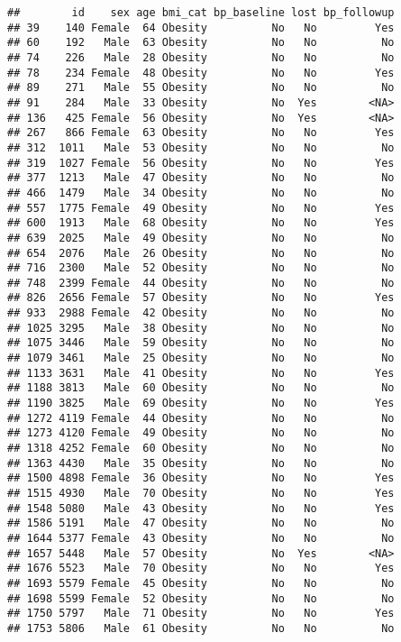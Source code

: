 \documentclass[
]{article}
\begin{document}
\begin{verbatim}
##        id    sex age bmi_cat bp_baseline lost bp_followup
## 39    140 Female  64 Obesity          No   No         Yes
## 60    192   Male  63 Obesity          No   No          No
## 74    226   Male  28 Obesity          No   No          No
## 78    234 Female  48 Obesity          No   No         Yes
## 89    271   Male  55 Obesity          No   No          No
## 91    284   Male  33 Obesity          No  Yes        <NA>
## 136   425 Female  56 Obesity          No  Yes        <NA>
## 267   866 Female  63 Obesity          No   No         Yes
## 312  1011   Male  53 Obesity          No   No          No
## 319  1027 Female  56 Obesity          No   No         Yes
## 377  1213   Male  47 Obesity          No   No          No
## 466  1479   Male  34 Obesity          No   No          No
## 557  1775 Female  49 Obesity          No   No         Yes
## 600  1913   Male  68 Obesity          No   No         Yes
## 639  2025   Male  49 Obesity          No   No          No
## 654  2076   Male  26 Obesity          No   No          No
## 716  2300   Male  52 Obesity          No   No          No
## 748  2399 Female  44 Obesity          No   No          No
## 826  2656 Female  57 Obesity          No   No         Yes
## 933  2988 Female  42 Obesity          No   No          No
## 1025 3295   Male  38 Obesity          No   No          No
## 1075 3446   Male  59 Obesity          No   No          No
## 1079 3461   Male  25 Obesity          No   No          No
## 1133 3631   Male  41 Obesity          No   No         Yes
## 1188 3813   Male  60 Obesity          No   No          No
## 1190 3825   Male  69 Obesity          No   No         Yes
## 1272 4119 Female  44 Obesity          No   No          No
## 1273 4120 Female  49 Obesity          No   No          No
## 1318 4252 Female  60 Obesity          No   No          No
## 1363 4430   Male  35 Obesity          No   No          No
## 1500 4898 Female  36 Obesity          No   No         Yes
## 1515 4930   Male  70 Obesity          No   No         Yes
## 1548 5080   Male  43 Obesity          No   No         Yes
## 1586 5191   Male  47 Obesity          No   No          No
## 1644 5377 Female  43 Obesity          No   No          No
## 1657 5448   Male  57 Obesity          No  Yes        <NA>
## 1676 5523   Male  70 Obesity          No   No         Yes
## 1693 5579 Female  45 Obesity          No   No          No
## 1698 5599 Female  52 Obesity          No   No          No
## 1750 5797   Male  71 Obesity          No   No         Yes
## 1753 5806   Male  61 Obesity          No   No          No

\end{verbatim}
\end{document}
